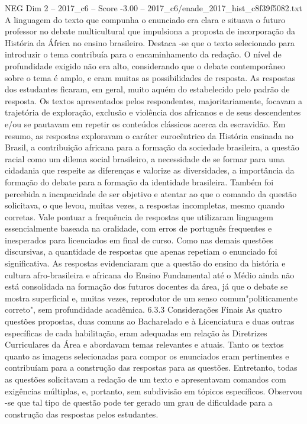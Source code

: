 \begin{textsample}{NEG Dim 2 – 2017\_c6 – Score -3.00 – 2017\_c6/enade\_2017\_hist\_c8f39f5082.txt}
A linguagem do texto que compunha o enunciado era clara e situava o futuro professor no debate multicultural que impulsiona a proposta de incorporação da História da África no ensino brasileiro.
Destaca -se que o texto selecionado para introduzir o tema contribuía para o encaminhamento da redação.
O nível de profundidade exigido não era alto, considerando que o debate contemporâneo sobre o tema é amplo, e eram muitas as possibilidades de resposta.
As respostas dos estudantes ficaram, em geral, muito aquém do estabelecido pelo padrão de resposta.
Os textos apresentados pelos respondentes, majoritariamente, focavam a trajetória de exploração, exclusão e violência dos africanos e de seus descendentes e/ou se pautavam em repetir os conteúdos clássicos acerca da escravidão.
Em resumo, as respostas exploravam o caráter eurocêntrico da História ensinada no Brasil, a contribuição africana para a formação da sociedade brasileira, a questão racial como um dilema social brasileiro, a necessidade de se formar para uma cidadania que respeite as diferenças e valorize as diversidades, a importância da formação do debate para a formação da identidade brasileira.
Também foi percebida a incapacidade de ser objetivo e atentar ao que o comando da questão solicitava, o que levou, muitas vezes, a respostas incompletas, mesmo quando corretas.
Vale pontuar a frequência de respostas que utilizaram linguagem essencialmente baseada na oralidade, com erros de português frequentes e inesperados para licenciados em final de curso.
Como nas demais questões discursivas, a quantidade de respostas que apenas repetiam o enunciado foi significativa.
As respostas evidenciaram que a questão do ensino da história e cultura afro-brasileira e africana do Ensino Fundamental até o Médio ainda não está consolidada na formação dos futuros docentes da área, já que o debate se mostra superficial e, muitas vezes, reprodutor de um senso comum"politicamente correto", sem profundidade acadêmica. 6.3.3 Considerações Finais As quatro questões propostas, duas comuns ao Bacharelado e à Licenciatura e duas outras específicas de cada habilitação, eram adequadas em relação às Diretrizes Curriculares da Área e abordavam temas relevantes e atuais.
Tanto os textos quanto as imagens selecionadas para compor os enunciados eram pertinentes e contribuíam para a construção das respostas para as questões.
Entretanto, todas as questões solicitavam a redação de um texto e apresentavam comandos com exigências múltiplas, e, portanto, sem subdivisão em tópicos específicos.
Observou -se que tal tipo de questão pode ter gerado um grau de dificuldade para a construção das respostas pelos estudantes.

\end{textsample}
